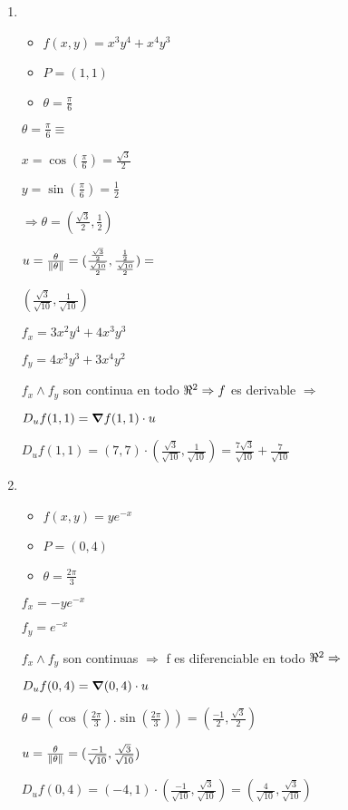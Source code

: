 \documentclass[../practica_04.tex]{subfiles}
\begin{document}
    \begin{enumerate}
        \item 
            \begin{itemize}
                \item $f(x,y) = x^3y^4+x^4y^3$
                \item $P = (1,1)$
                \item $\theta = \frac{\pi}{6}$
            \end{itemize}

            $ \theta = \frac{\pi}{6} \equiv $

            $ x = \cos(\frac{\pi}{6}) = \frac{\sqrt{3}}{2} $

            $ y = \sin(\frac{\pi}{6}) = \frac{1}{2}$

            $ \Rightarrow \theta = (\frac{\sqrt{3}}{2}, \frac{1}{2}) $

            $ u = \frac{\theta}{\norm*{\theta}} = (\frac{\frac{\sqrt{3}}{2}}{\frac{\sqrt{10}}{2}}, \frac{\frac{1}{2}}{\frac{\sqrt{10}}{2}}) = $

            $ (\frac{\sqrt{3}}{\sqrt{10}},\frac{1}{\sqrt{10}}) $

            $ f_x = 3x^2y^4 + 4x^3y^3 $

            $ f_y = 4x^3y^3 + 3x^4y^2 $

            $ f_x \wedge f_y$ son continua en todo $\real^2 \Rightarrow f$ es derivable $ \Rightarrow $

            $ D_uf(1,1)= \grad f (1,1) \cdot u$

            $ D_uf(1,1)= (7, 7) \cdot (\frac{\sqrt{3}}{\sqrt{10}},\frac{1}{\sqrt{10}}) = \frac{7\sqrt{3}}{\sqrt{10}} + \frac{7}{\sqrt{10}}$

        \item 
            \begin{itemize}
                \item $f(x,y) = ye^{-x}$
                \item $P = (0,4)$
                \item $\theta = \frac{2\pi}{3}$
            \end{itemize}

            $ f_x = -ye^{-x} $

            $ f_y = e^{-x} $

            $ f_x \wedge f_y $ son continuas $\Rightarrow$ f es diferenciable en todo $\real^2 \Rightarrow$

            $ D_uf(0,4) = \grad (0,4) \cdot u$

            $ \theta = (\cos(\frac{2\pi}{3}). \sin(\frac{2\pi}{3})) = (\frac{-1}{2}, \frac{\sqrt{3}}{2})$

            $ u = \frac{\theta}{\norm*{\theta}} = (\frac{-1}{\sqrt{10}},\frac{\sqrt{3}}{\sqrt{10}})  $

            $ D_uf(0,4) = (-4, 1)\cdot (\frac{-1}{\sqrt{10}},\frac{\sqrt{3}}{\sqrt{10}}) = (\frac{4}{\sqrt{10}},\frac{\sqrt{3}}{\sqrt{10}}) $

    \end{enumerate}
\end{document}
